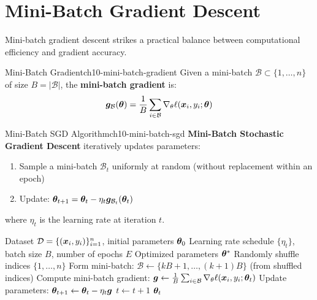 \documentclass[../../main.tex]{subfiles}
\begin{document}
\section{Mini-Batch Gradient Descent}
\label{sec:ch10-mini-batch}

Mini-batch gradient descent strikes a practical balance between computational efficiency and gradient accuracy.

\begin{definition}{Mini-Batch Gradient}{ch10-mini-batch-gradient}
Given a mini-batch $\mathcal{B} \subset \{1, \ldots, n\}$ of size $B = |\mathcal{B}|$, the \textbf{mini-batch gradient} is:
\[
    \boldsymbol{g}_\mathcal{B}(\boldsymbol{\theta}) = \frac{1}{B} \sum_{i \in \mathcal{B}} \nabla_\theta \ell(\boldsymbol{x}_i, y_i; \boldsymbol{\theta})
\]
\end{definition}

\begin{definition}{Mini-Batch SGD Algorithm}{ch10-mini-batch-sgd}
\textbf{Mini-Batch Stochastic Gradient Descent} iteratively updates parameters:
\begin{enumerate}
    \item Sample a mini-batch $\mathcal{B}_t$ uniformly at random (without replacement within an epoch)
    \item Update: $\boldsymbol{\theta}_{t+1} = \boldsymbol{\theta}_t - \eta_t \boldsymbol{g}_{\mathcal{B}_t}(\boldsymbol{\theta}_t)$
\end{enumerate}
where $\eta_t$ is the learning rate at iteration $t$.
\end{definition}

\begin{algorithm}[htbp]
\caption{Mini-Batch Stochastic Gradient Descent}
\label{alg:ch10-mini-batch-sgd}
\begin{algorithmic}[1]
\Require Dataset $\mathcal{D} = \{(\boldsymbol{x}_i, y_i)\}_{i=1}^n$, initial parameters $\boldsymbol{\theta}_0$
\Require Learning rate schedule $\{\eta_t\}$, batch size $B$, number of epochs $E$
\Ensure Optimized parameters $\boldsymbol{\theta}^*$
    \State Randomly shuffle indices $\{1, \ldots, n\}$
        \State Form mini-batch: $\mathcal{B} \gets \{kB + 1, \ldots, (k+1)B\}$ (from shuffled indices)
        \State Compute mini-batch gradient: $\boldsymbol{g} \gets \frac{1}{B}\sum_{i \in \mathcal{B}} \nabla_\theta \ell(\boldsymbol{x}_i, y_i; \boldsymbol{\theta}_t)$
        \State Update parameters: $\boldsymbol{\theta}_{t+1} \gets \boldsymbol{\theta}_t - \eta_t \boldsymbol{g}$
        \State $t \gets t + 1$
    \EndFor
\EndFor
\State \Return $\boldsymbol{\theta}_t$
\end{algorithmic}
\end{algorithm}
\end{document}
